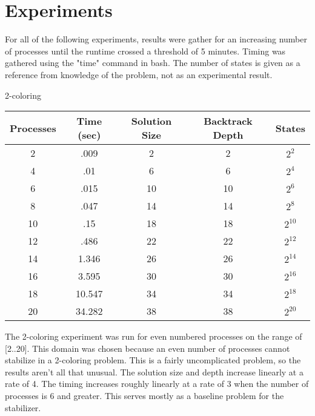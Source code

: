 \section{Experiments}
For all of the following experiments, results were gather for an increasing number of processes until the runtime crossed a threshold of 5 minutes.
Timing was gathered using the "time" command in bash.  The number of states is given as a reference from knowledge of the problem, not as an
experimental result.
\begin{center}
2-coloring \\
\begin{tabular}{|c|c|c|c|c|}
\hline
 Processes & Time (sec) & Solution Size & Backtrack Depth & States \\
\hline
 2 & .009 & 2 & 2 & $2^{2}$             \\
 4 & .01 & 6 & 6 & $2^{4}$              \\
 6 & .015 & 10 & 10 & $2^{6}$           \\
 8 & .047 & 14 & 14 & $2^{8}$           \\
 10 & .15 & 18 & 18 & $2^{10}$          \\
 12 & .486 & 22 & 22 & $2^{12}$         \\
 14 & 1.346 & 26 & 26 & $2^{14}$        \\
 16 & 3.595 & 30 & 30 & $2^{16}$        \\
 18 & 10.547 & 34 & 34 & $2^{18}$       \\
 20 & 34.282 & 38 & 38 & $2^{20}$       \\
\hline
\end{tabular}
\end{center}

The 2-coloring experiment was run for even numbered processes on the range of [2..20].  This domain was chosen because an even number of processes
cannot stabilize in a 2-coloring problem.  This is a fairly uncomplicated problem, so the results aren't all that unusual.  The solution size and depth
increase linearly at a rate of 4.  The timing increases roughly linearly at a rate of 3 when the number of processes is 6 and greater.  This serves
mostly as a baseline problem for the stabilizer.

